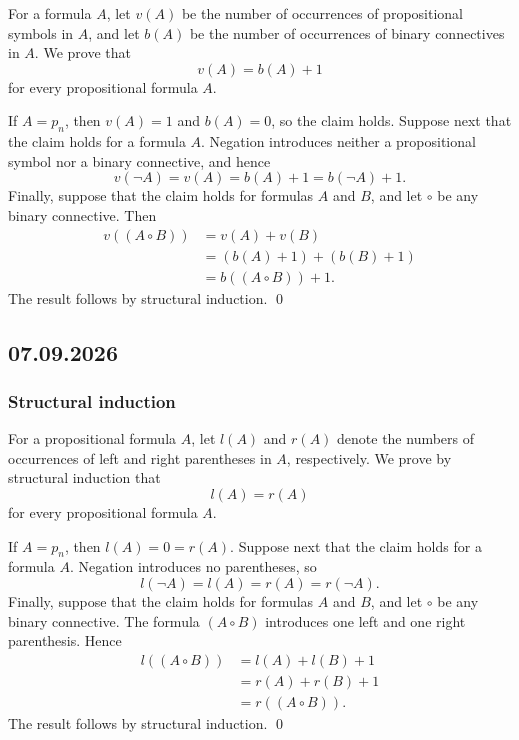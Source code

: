 \documentclass[11pt,a4paper]{amsart}
\begin{document}
\begin{example}
  For a formula \(A\), let \(v(A)\) be the number of occurrences of
  propositional symbols in \(A\), and let \(b(A)\) be the number of
  occurrences of binary connectives in \(A\). We prove that
  \[
    v(A)=b(A)+1
  \]
  for every propositional formula \(A\).

  If \(A=p_n\), then \(v(A)=1\) and \(b(A)=0\), so the claim holds. Suppose
  next that the claim holds for a formula \(A\). Negation introduces neither
  a propositional symbol nor a binary connective, and hence
  \[
    v(\neg A)=v(A)=b(A)+1=b(\neg A)+1.
  \]
  Finally, suppose that the claim holds for formulas \(A\) and \(B\), and let
  \(\circ\) be any binary connective. Then
  \begin{align*}
    v((A \mathbin{\circ} B))
    &=v(A)+v(B) \\
    &=(b(A)+1)+(b(B)+1) \\
    &=b((A \mathbin{\circ} B))+1.
  \end{align*}
  The result follows by structural induction. \qed
\end{example}

\subsection{07.09.2026}

\subsubsection{Structural induction}

\begin{example}
  For a propositional formula \(A\), let \(l(A)\) and \(r(A)\) denote the
  numbers of occurrences of left and right parentheses in \(A\), respectively.
  We prove by structural induction that
  \[
    l(A)=r(A)
  \]
  for every propositional formula \(A\).

  If \(A=p_n\), then \(l(A)=0=r(A)\). Suppose next that the claim holds for
  a formula \(A\). Negation introduces no parentheses, so
  \[
    l(\neg A)=l(A)=r(A)=r(\neg A).
  \]
  Finally, suppose that the claim holds for formulas \(A\) and \(B\), and let
  \(\circ\) be any binary connective. The formula \((A \mathbin{\circ} B)\)
  introduces one left and one right parenthesis. Hence
  \begin{align*}
    l((A \mathbin{\circ} B))
    &=l(A)+l(B)+1 \\
    &=r(A)+r(B)+1 \\
    &=r((A \mathbin{\circ} B)).
  \end{align*}
  The result follows by structural induction. \qed
\end{example}
\end{document}
